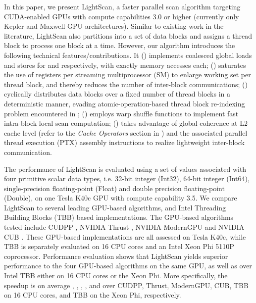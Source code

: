 \documentclass[article]{elsarticle}
\begin{document}
{In this paper, we present LightScan, a faster parallel scan algorithm targeting CUDA-enabled GPUs with compute capabilities 3.0 or higher (currently only Kepler \cite{kepler} and Maxwell \cite{maxwell} GPU architectures). Similar to existing work in the literature, LightScan also partitions  into a set of data blocks and assigns a thread block to process one block at a time. However, our algorithm introduces the following technical features/contributions. It () implements coalesced global loads and stores for  and  respectively, with exactly  memory accesses each; () saturates the use of registers per streaming multiprocessor (SM) to enlarge working set per thread block, and thereby reduces the number of inter-block communications; () cyclically distributes data blocks over a fixed number of thread blocks in a deterministic manner, evading atomic-operation-based thread block re-indexing problem encountered in \cite{yan2013streamscan}; () employs warp shuffle functions to implement fast intra-block local scan computation; () takes advantage of global coherence at L2 cache level (refer to the \textit{Cache Operators} section in \cite{ptxisa43}) and the associated parallel thread execution (PTX) assembly instructions to realize lightweight inter-block communication.

The performance of LightScan is evaluated using a set of  values associated with four primitive scalar data types, i.e. 32-bit integer (Int32), 64-bit integer (Int64), single-precision floating-point (Float) and double precision floating-point (Double), on one Tesla K40c GPU with compute capability 3.5. We compare LightScan to several leading GPU-based algorithms, and Intel Threading Building Blocks (TBB) \cite{tbb} based implementations. The GPU-based algorithms tested include CUDPP \cite{harris2007parallel}, NVIDIA Thrust \cite{thrust}, NVIDIA ModernGPU \cite{moderngpu} and NVIDIA CUB \cite{cub}. These GPU-based implementations are all assessed on Tesla K40c, while TBB is separately evaluated on 16 CPU cores and an Intel Xeon Phi 5110P coprocessor. Performance evaluation shows that LightScan yields superior performance to the four GPU-based algorithms on the same GPU, as well as over Intel TBB either on 16 CPU cores or the Xeon Phi. More specifically, the speedup is on average , , , ,  and  over CUDPP, Thrust, ModernGPU, CUB, TBB on 16 CPU cores, and TBB on the Xeon Phi, respectively.
}
\end{document}
